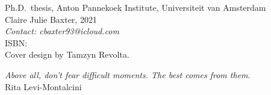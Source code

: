 
\cleardoublepage
\thispagestyle{empty}
{\raggedright
  \small
  \noindent Ph.D.~thesis, Anton Pannekoek Institute, Universiteit van Amsterdam\\
  \noindent Claire Julie Baxter, 2021\\
    \noindent \textit{Contact: cbaxter93@icloud.com} \\[3ex]

  \noindent ISBN:  \\[3ex]

  \noindent Cover design by Tamzyn Revolta.\\



}



\cleardoublepage
\thispagestyle{empty}
\null\vfill\null

\hfill\parbox{125mm}{
\raggedleft\emph{\large Above all, don’t fear difficult moments. The best comes from them.}\\[5pt]
Rita Levi-Montalcini
}
\vfill
\clearpage
\thispagestyle{empty}
\newpage
\phantom{let's kill those trees}


\pagestyle{fancy}

